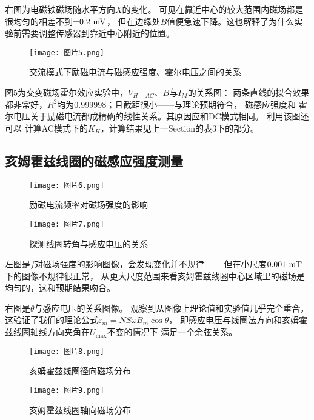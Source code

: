 \documentclass[11pt]{article}
\begin{document}
右图为电磁铁磁场随水平方向$X$的变化。
可见在靠近中心的较大范围内磁场都是很均匀的相差不到$\pm0.2\,\,{\rm mV}$，
但在边缘处$B$值便急速下降。这也解释了为什么实验前需要调整传感器到靠近中心附近的位置。



\begin{figure}[H]
    \centering
    \texttt{[image: 图片5.png]}
    \caption{交流模式下励磁电流与磁感应强度、霍尔电压之间的关系}
\end{figure}

图5为交变磁场霍尔效应实验中，$V_{H-AC}$、$B$与$I_M$的关系图：
两条直线的拟合效果都非常好，$R^2$均为0.999998；且截距很小——与理论预期符合，
磁感应强度和
霍尔电压关于励磁电流都成精确的线性关系。其原因应和DC模式相同。
利用该图还可以
计算AC模式下的$K_H$，计算结果见上一Section的表3下的部分。



\subsection{亥姆霍兹线圈的磁感应强度测量}

\begin{figure}[H]
	\centering
	\begin{minipage}{0.49\linewidth}
		\centering
		\texttt{[image: 图片6.png]}
		\caption{励磁电流频率对磁场强度的影响}
	\end{minipage}
	\begin{minipage}{0.49\linewidth}
		\centering
		\texttt{[image: 图片7.png]}
		\caption{探测线圈转角与感应电压的关系}
	\end{minipage}
\end{figure}

左图是$f$对磁场强度的影响图像，会发现变化并不规律——
但在小尺度$0.001\,\,{\rm mT}$下的图像不规律很正常，
从更大尺度范围来看亥姆霍兹线圈中心区域里的磁场是均匀的，这和预期结果吻合。

右图是$\theta$与感应电压的关系图像。
观察到从图像上理论值和实验值几乎完全重合，
这验证了我们的理论公式$\varepsilon_m=NS\omega B_{m}\cos \theta$，
即感应电压与线圈法方向和亥姆霍兹线圈轴线方向夹角在$U_{\max }$不变的情况下
满足一个余弦关系。















\begin{figure}[H]
	\centering
	\begin{minipage}{0.49\linewidth}
		\centering
		\texttt{[image: 图片8.png]}
		\caption{亥姆霍兹线圈径向磁场分布}
	\end{minipage}
	\begin{minipage}{0.49\linewidth}
		\centering
		\texttt{[image: 图片9.png]}
		\caption{亥姆霍兹线圈轴向磁场分布}
	\end{minipage}
\end{figure}
\end{document}
